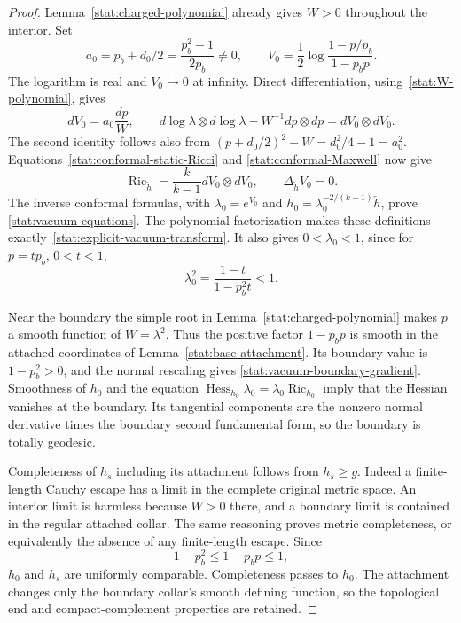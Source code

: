\begin{proof}
Lemma~\ref{stat:charged-polynomial} already gives $W>0$ throughout
the interior.  Set
\[
 a_0=p_b+d_0/2=\frac{p_b^2-1}{2p_b}\ne0,
 \qquad
 V_0=\frac12\log
      \frac{1-p/p_b}{1-p_bp}.
\]
The logarithm is real and $V_0\to0$ at infinity.  Direct
differentiation, using~\eqref{stat:W-polynomial}, gives
\begin{equation}
 dV_0=a_0\frac{dp}{W},\qquad
 d\log\lambda\otimes d\log\lambda-W^{-1}dp\otimes dp
       =dV_0\otimes dV_0.
 \label{stat:vacuum-target-identity}
\end{equation}
The second identity follows also from
$(p+d_0/2)^2-W=d_0^2/4-1=a_0^2$.
Equations~\eqref{stat:conformal-static-Ricci} and
\eqref{stat:conformal-Maxwell} now give
\[
 \operatorname{Ric}_{\check h}
      =\frac{k}{k-1}dV_0\otimes dV_0,
 \qquad \Delta_{\check h}V_0=0.
\]
The inverse conformal formulas, with
$\lambda_0=e^{V_0}$ and
$h_0=\lambda_0^{-2/(k-1)}\check h$, prove
\eqref{stat:vacuum-equations}.  The polynomial factorization makes
these definitions exactly~\eqref{stat:explicit-vacuum-transform}.
It also gives $0<\lambda_0<1$, since for $p=t p_b$, $0<t<1$,
\[
 \lambda_0^2=\frac{1-t}{1-p_b^2t}<1.
\]

Near the boundary the simple root in
Lemma~\ref{stat:charged-polynomial} makes $p$ a smooth function of
$W=\lambda^2$.  Thus the positive factor $1-p_bp$ is smooth in the
attached coordinates of Lemma~\ref{stat:base-attachment}.  Its
boundary value is $1-p_b^2>0$, and the normal rescaling gives
\eqref{stat:vacuum-boundary-gradient}.  Smoothness of $h_0$ and
the equation
$\operatorname{Hess}_{h_0}\lambda_0
=\lambda_0\operatorname{Ric}_{h_0}$ imply that the Hessian
vanishes at the boundary.  Its tangential components are the
nonzero normal derivative times the boundary second fundamental
form, so the boundary is totally geodesic.

Completeness of $h_s$ including its attachment follows from
$h_s\geq g$.  Indeed a finite-length Cauchy escape has a limit in
the complete original metric space.  An interior limit is harmless
because $W>0$ there, and a boundary limit is contained in the
regular attached collar.  The same reasoning proves metric
completeness, or equivalently the absence of any finite-length
escape.  Since
\[
 1-p_b^2\leq1-p_bp\leq1,
\]
$h_0$ and $h_s$ are uniformly comparable.  Completeness passes to
$h_0$.  The attachment changes only the boundary collar's smooth
defining function, so the topological end and compact-complement
properties are retained.
\end{proof}


